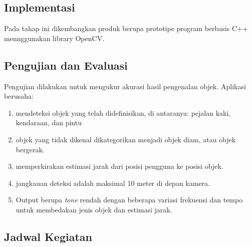 \subsection*{Implementasi}

Pada tahap ini dikembangkan produk berupa prototipe program berbasis C++ mennggunakan library OpenCV.

\subsection*{Pengujian dan Evaluasi}

Pengujian dilakukan untuk mengukur akurasi hasil pengenalan objek. Aplikasi berusaha:
\begin{enumerate}
	\item mendeteksi objek yang telah didefinisikan, di antaranya: pejalan kaki, kendaraan, dan pintu
	\item objek yang tidak dikenal dikategorikan menjadi objek diam, atau objek bergerak. 
	\item memperkirakan estimasi jarak dari posisi pengguna ke posisi objek.
	\item jangkauan deteksi adalah maksimal 10 meter di depan kamera.
	\item Output berupa \textit{tone} rendah dengan beberapa variasi frekuensi dan tempo untuk membedakan jenis objek dan estimasi jarak.
\end{enumerate}

\iffalse
\subsection*{Evaluasi}

Pengujian yang dilakukan di tahap sebelumnya dievaluasi pada tahap ini. Pengujian pertama dinyatakan berhasil jika efisiensi frekuensi mencapai 100$\%$ artinya frekuensi yang dihasilkan sesuai dengan input yang dimasukkan. Pengujian kedua dinyatakan berhasil jika tikus yang berada pada kandang berpindah tempat ke kandang lain setelah terkena gelombang ultrasonik dari alat. Pengulangan implementasi dilakukan jika salah satu atau kedua pengujian dinyatakan tidak berhasil atau gagal.
\fi
\subsection*{Jadwal Kegiatan}

